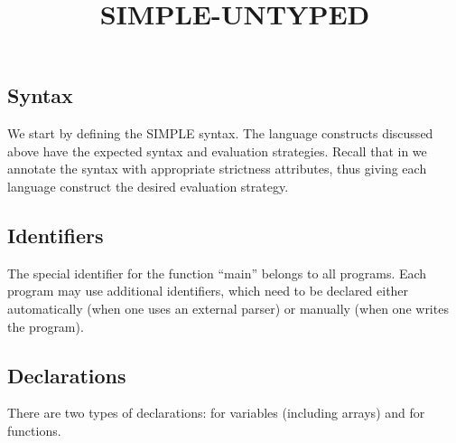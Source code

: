 \documentclass{article}
\title{SIMPLE-UNTYPED}
\begin{document}
\begin{kdefinition}
\maketitle
\begin{module}{}
\begin{kblock}[text]
 \section{Syntax}
We start by defining the SIMPLE syntax.  The language constructs discussed
above have the expected syntax and evaluation strategies.  Recall that in \K
we annotate the syntax with appropriate strictness attributes, thus giving
each language construct the desired evaluation strategy. \end{kblock}
\begin{kblock}[text]
 \subsection{Identifiers}
The special identifier for the function ``main'' belongs to all programs.
Each program may use additional identifiers, which need to be declared either
automatically (when one uses an external parser) or manually
(when one writes the program). \end{kblock}
\begin{kblock}[text]
 \subsection{Declarations}
There are two types of declarations: for variables (including arrays) and
for functions. \end{kblock}

\begin{syntaxBlock}{}
\end{syntaxBlock}

\begin{syntaxBlock}{}
\end{syntaxBlock}

\begin{syntaxBlock}{}
\end{syntaxBlock}

\begin{syntaxBlock}{}
\end{syntaxBlock}
\begin{kblock}[text]

\end{kblock}
\end{module}
\end{kdefinition}
\end{document}

